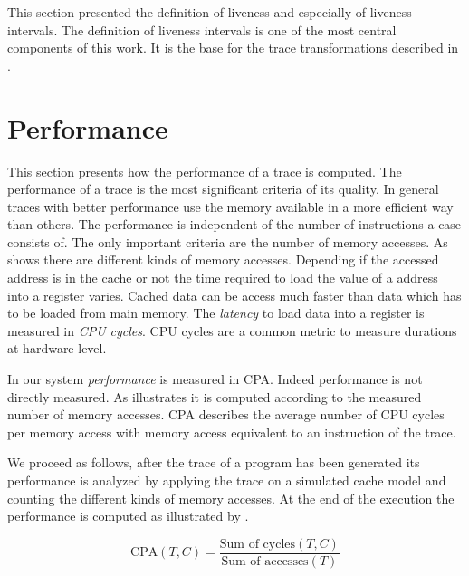 \documentclass[onecolumn, openright, master, english, signatures]{dbrgrptt}
\begin{document}
This section presented the definition of liveness and especially of liveness intervals. The definition of liveness intervals is one of the most central components of this work. It is the base for the trace transformations described in .


\section{Performance}\label{sec:performance}

This section presents how the performance of a trace is computed. The performance of a trace is the most significant criteria of its quality. In general \ac{trace}s with better performance use the memory available in a more efficient way than others. The performance is independent of the number of instructions a case consists of. The only important criteria are the number of memory accesses. As  shows there are different kinds of memory accesses. Depending if the accessed address is in the cache or not the time required to load the value of a address into a register varies. Cached data can be access much faster than data which has to be loaded from main memory. The \emph{latency} to load data into a register is measured in \emph{\ac{CPU} cycles}. \ac{CPU} cycles are a common metric to measure durations at hardware level.

In our system \emph{performance} is measured in \ac{CPA}. Indeed performance is not directly measured. As  illustrates it is computed according to the measured number of memory accesses. \ac{CPA} describes the average number of \ac{CPU} cycles per memory access with memory access equivalent to an instruction of the trace.

We proceed as follows, after the \ac{trace} of a program has been generated its performance is analyzed by applying the trace on a simulated cache model and counting the different kinds of memory accesses. At the end of the execution the performance is computed as illustrated by .

\begin{equation}\label{equ:performance-cpa}
\text{CPA}(T,C) = \frac{\text{Sum of cycles}(T, C)}{\text{Sum of accesses}(T)}
\end{equation}
\end{document}
